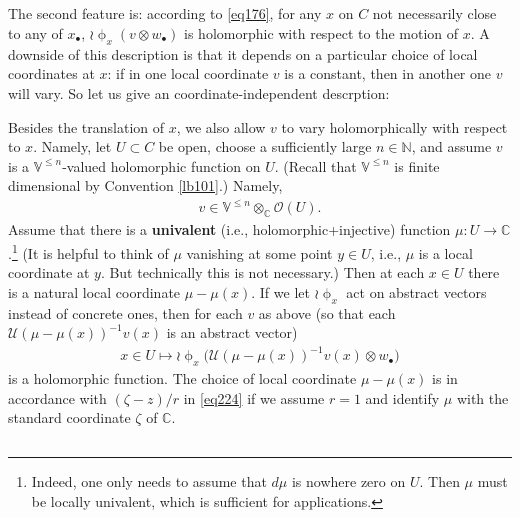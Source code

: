 \documentclass[11pt,b5paper,notitlepage]{article}
\theoremstyle{definition}
\theoremstyle{plain}
\newcommand{\mc}{\mathcal}
\newcommand{\scr}{\mathscr}
\newcommand{\blt}{\bullet}
\newcommand{\Vbb}{\mathbb V}
\newcommand{\Cbb}{\mathbb C}
\newcommand{\Nbb}{\mathbb N}
\numberwithin{equation}{section}
\begin{document}
\subsection{}

The second feature is: according to \eqref{eq176}, for any $x$ on $C$ not necessarily close to any of $x_\blt$, $\wr\upphi_x(v\otimes w_\blt)$ is holomorphic with respect to the motion of $x$. A downside of this description is that it depends on a particular choice of local coordinates at $x$: if in one local coordinate $v$ is a constant, then in another one $v$ will vary. So let us give an coordinate-independent descrption: 

Besides the translation of $x$, we also allow $v$ to vary holomorphically with respect to $x$. Namely, let $U\subset C$ be open, choose a sufficiently large $n\in\Nbb$, and assume $v$ is a $\Vbb^{\leq n}$-valued holomorphic function on $U$. (Recall that $\Vbb^{\leq n}$ is finite dimensional by Convention \ref{lb101}.) Namely,
\begin{align}
v\in\Vbb^{\leq n}\otimes_\Cbb \scr O(U).	
\end{align}
Assume that there is a \textbf{univalent}  (i.e., holomorphic+injective) function $\mu:U\rightarrow\Cbb$.\footnote{Indeed, one only needs to assume that $d\mu$ is nowhere zero on $U$. Then $\mu$ must be locally univalent, which is sufficient for applications.} (It is helpful to think of $\mu$ vanishing at some point $y\in U$, i.e., $\mu$ is a local coordinate at $y$. But technically this is not necessary.) Then at each $x\in U$ there is a natural local coordinate $\mu-\mu(x)$. If we let $\wr\upphi_x$ act on abstract vectors instead of concrete ones, then for each $v$ as above (so that each $\mc U(\mu-\mu(x))^{-1}v(x)$ is an abstract vector)
\begin{align}
x\in U\mapsto \wr\upphi_x\big(\mc U(\mu-\mu(x))^{-1}v(x)\otimes w_\blt\big)	\label{eq178}
\end{align}
is a holomorphic function. The choice of local coordinate $\mu-\mu(x)$ is in accordance with $(\zeta-z)/r$ in \eqref{eq224} if we assume $r=1$ and identify $\mu$ with the standard coordinate $\zeta$ of $\Cbb$.


\subsection{}
\end{document}
